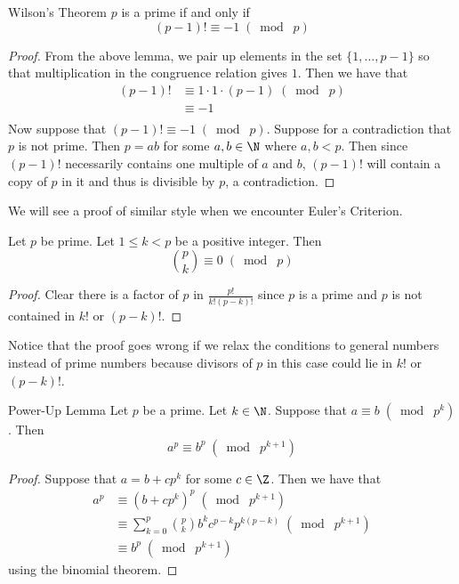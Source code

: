 \begin{thm}{Wilson's Theorem}{} $p$ is a prime if and only if $$(p-1)!\equiv-1\;(\bmod\;p)$$ \tcbline
\begin{proof}
From the above lemma, we pair up elements in the set $\{1,\dots,p-1\}$ so that multiplication in the congruence relation gives $1$. Then we have that 
\begin{align*}
(p-1)!&\equiv 1\cdot 1\cdot (p-1)\;(\bmod\;p)\\
&\equiv -1\\
\end{align*}
Now suppose that $(p-1)!\equiv -1\;(\bmod\;p)$. Suppose for a contradiction that $p$ is not prime. Then $p=ab$ for some $a,b\in\N$ where $a,b<p$. Then since $(p-1)!$ necessarily contains one multiple of $a$ and $b$, $(p-1)!$ will contain a copy of $p$ in it and thus is divisible by $p$, a contradiction. 
\end{proof}
\end{thm}

We will see a proof of similar style when we encounter Euler's Criterion. 

\begin{lmm}{}{} Let $p$ be prime. Let $1\leq k<p$ be a positive integer. Then $$\binom{p}{k}\equiv0\;(\bmod\;p)$$ \tcbline
\begin{proof}
Clear there is a factor of $p$ in $\frac{p!}{k!(p-k)!}$ since $p$ is a prime and $p$ is not contained in $k!$ or $(p-k)!$. 
\end{proof}
\end{lmm}

Notice that the proof goes wrong if we relax the conditions to general numbers instead of prime numbers because divisors of $p$ in this case could lie in $k!$ or $(p-k)!$. 

\begin{lmm}{Power-Up Lemma}{} Let $p$ be a prime. Let $k\in\N$. Suppose that $a\equiv b\;(\bmod\;p^k)$. Then $$a^p\equiv b^p\;(\bmod\;p^{k+1})$$ \tcbline
\begin{proof}
Suppose that $a=b+cp^k$ for some $c\in\Z$. Then we have that 
\begin{align*}
a^p&\equiv(b+cp^k)^p\;(\bmod\;p^{k+1})\\
&\equiv\sum_{k=0}^p\binom{p}{k}b^kc^{p-k}p^{k(p-k)}\;(\bmod\;p^{k+1})\\
&\equiv b^p\;(\bmod\;p^{k+1})
\end{align*}
using the binomial theorem. 
\end{proof}
\end{lmm}

